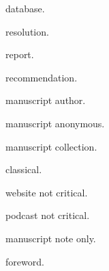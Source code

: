 \documentclass[font=termes]{mbts}
\begin{document}
\noindent database.\autocite{database}\par
\noindent resolution.\autocite[12]{resolution}\par
\newpage
\noindent report.\autocite[12]{report}\par
\noindent recommendation.\autocite[12]{recommendation}\par
\noindent manuscript author.\autocite{manuscript-author}\par
\noindent manuscript anonymous.\autocite{manuscript-anonymous}\par
\noindent manuscript collection.\autocite{manuscript-collection}\par
\noindent classical.\autocite[2.3.4]{classical}\par
\noindent website not critical.\autocite{website-not-critical}\par
\noindent podcast not critical.\autocite{podcast-not-critical}\par
\newpage
\noindent manuscript note only.\autocite{manuscript-note-only}\par
\noindent foreword.\autocite[vii]{foreword}\par
\mbtsprintbibliography
\end{document}
